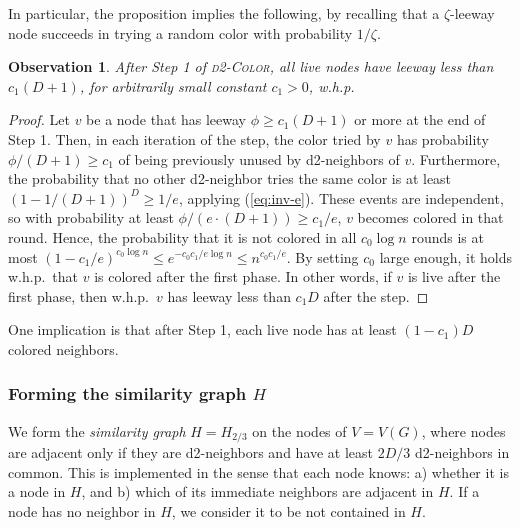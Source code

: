 \documentclass[12pt,a4]{article}
\newtheorem{observation}[theorem]{Observation}
\newcommand{\alg}[1]{\textsc{#1}}
\begin{document}
In particular, the proposition implies the following, by recalling that a $\zeta$-leeway node succeeds in trying a random color with probability $1/\zeta$.

\begin{observation}
After Step 1 of \alg{d2-Color}, all live nodes have leeway less than $c_1 (D+1)$, for arbitrarily small constant $c_1 > 0$, w.h.p. 
\label{obs:sparse}
\end{observation}

\begin{proof}
Let $v$ be a node that has leeway $\phi \ge c_1 (D+1)$ or more at the end of Step 1.
Then, in each iteration of the step, the color tried by $v$ has probability $\phi/(D+1) \ge c_1$ of being previously unused by d2-neighbors of $v$. Furthermore, the probability that no other d2-neighbor tries the same color is at least $(1-1/(D+1))^{D} \ge 1/e$, applying (\ref{eq:inv-e}). These events are independent, so with probability at least $\phi/(e \cdot (D+1)) \ge c_1/e$, $v$ becomes colored in that round. Hence, the probability that it is not colored in all $c_0 \log n$ rounds is at most $(1-c_1/e)^{c_0\log n} \le e^{-c_0 c_1/e \log n} \le n^{c_0 c_1/e}$.
By setting $c_0$ large enough, it holds w.h.p.\ that $v$ is colored after the first phase.
In other words, if $v$ is live after the first phase, then w.h.p.\ $v$ has leeway less than $c_1 D$ after the step. 
\end{proof}

One implication is that after Step 1, each live node has at least $(1-c_1)D$ colored neighbors. 


\subsubsection{Forming the similarity graph $H$} 

We form the \emph{similarity graph} $H = H_{2/3}$ on the nodes of $V = V(G)$, where nodes are adjacent only if they are d2-neighbors and have at least $2D/3$ d2-neighbors in common.
This is implemented in the sense that each node knows:
a) whether it is a node in $H$, and
b) which of its immediate neighbors are adjacent in $H$.
If a node has no neighbor in $H$, we consider it to be not contained in $H$.
\end{document}

